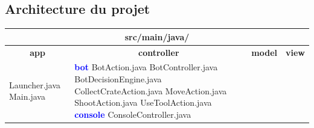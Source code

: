 \documentclass[a4paper, 12pt]{article}
\begin{document}
    \begin{landscape}
        \thispagestyle{empty}
        \section{Architecture du projet}

            \begin{table}[H]
                \centering
                \small
                \renewcommand{\arraystretch}{1.2}
                \begin{tabular}{|p{5.5cm}|p{5.5cm}|p{5.5cm}|p{5.5cm}|}
                    \hline
                    \multicolumn{4}{|c|}{\cellcolor{gray!40}\textbf{src/main/java/}} \\
                    \hline
                    \multicolumn{1}{|c|}{\cellcolor{gray!10}\textbf{app}} & \multicolumn{1}{c|}{\cellcolor{gray!10}\textbf{controller}} & \multicolumn{1}{c|}{\cellcolor{gray!10}\textbf{model}} & \multicolumn{1}{c|}{\cellcolor{gray!10}\textbf{view}} \\
                    \hline
                        Launcher.java \newline
                        Main.java
                        &
                        \textcolor{blue}{\textbf{bot}} \newline
                            \hspace*{0.4cm} BotAction.java \newline
                            \hspace*{0.4cm} BotController.java \newline
                            \hspace*{0.4cm} BotDecisionEngine.java \newline
                            \hspace*{0.4cm} CollectCrateAction.java \newline
                            \hspace*{0.4cm} MoveAction.java \newline
                            \hspace*{0.4cm} ShootAction.java \newline
                            \hspace*{0.4cm} UseToolAction.java \newline
                        \textcolor{blue}{\textbf{console}} \newline
                            \hspace*{0.4cm} ConsoleController.java \newline

\end{tabular}
\end{table}
\end{landscape}
\end{document}

